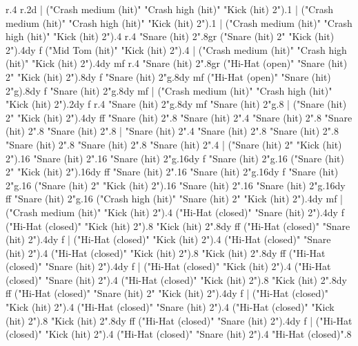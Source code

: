       r.4
      r.2{d}
    |
      ("Crash medium (hit)" "Crash high (hit)" "Kick (hit) 2").1
    |
      ("Crash medium (hit)" "Crash high (hit)" "Kick (hit) 2").1
    |
      ("Crash medium (hit)" "Crash high (hit)" "Kick (hit) 2").4
      r.4
      "Snare (hit) 2".8{gr}
      ("Snare (hit) 2" "Kick (hit) 2").4{dy f}
      ("Mid Tom (hit)" "Kick (hit) 2").4
    |
      ("Crash medium (hit)" "Crash high (hit)" "Kick (hit) 2").4{dy mf}
      r.4
      "Snare (hit) 2".8{gr}
      ("Hi-Hat (open)" "Snare (hit) 2" "Kick (hit) 2").8{dy f}
      "Snare (hit) 2"{g}.8{dy mf}
      ("Hi-Hat (open)" "Snare (hit) 2"{g}).8{dy f}
      "Snare (hit) 2"{g}.8{dy mf}
    |
      ("Crash medium (hit)" "Crash high (hit)" "Kick (hit) 2").2{dy f}
      r.4
      "Snare (hit) 2"{g}.8{dy mf}
      "Snare (hit) 2"{g}.8
    |
      ("Snare (hit) 2" "Kick (hit) 2").4{dy ff}
      "Snare (hit) 2".8
      "Snare (hit) 2".4
      "Snare (hit) 2".8
      "Snare (hit) 2".8
      "Snare (hit) 2".8
    |
      "Snare (hit) 2".4
      "Snare (hit) 2".8
      "Snare (hit) 2".8
      "Snare (hit) 2".8
      "Snare (hit) 2".8
      "Snare (hit) 2".4
    |
      ("Snare (hit) 2" "Kick (hit) 2").16
      "Snare (hit) 2".16
      "Snare (hit) 2"{g}.16{dy f}
      "Snare (hit) 2"{g}.16
      ("Snare (hit) 2" "Kick (hit) 2").16{dy ff}
      "Snare (hit) 2".16
      "Snare (hit) 2"{g}.16{dy f}
      "Snare (hit) 2"{g}.16
      ("Snare (hit) 2" "Kick (hit) 2").16
      "Snare (hit) 2".16
      "Snare (hit) 2"{g}.16{dy ff}
      "Snare (hit) 2"{g}.16
      ("Crash high (hit)" "Snare (hit) 2" "Kick (hit) 2").4{dy mf}
    |
      ("Crash medium (hit)" "Kick (hit) 2").4
      ("Hi-Hat (closed)" "Snare (hit) 2").4{dy f}
      ("Hi-Hat (closed)" "Kick (hit) 2").8
      "Kick (hit) 2".8{dy ff}
      ("Hi-Hat (closed)" "Snare (hit) 2").4{dy f}
    |
      ("Hi-Hat (closed)" "Kick (hit) 2").4
      ("Hi-Hat (closed)" "Snare (hit) 2").4
      ("Hi-Hat (closed)" "Kick (hit) 2").8
      "Kick (hit) 2".8{dy ff}
      ("Hi-Hat (closed)" "Snare (hit) 2").4{dy f}
    |
      ("Hi-Hat (closed)" "Kick (hit) 2").4
      ("Hi-Hat (closed)" "Snare (hit) 2").4
      ("Hi-Hat (closed)" "Kick (hit) 2").8
      "Kick (hit) 2".8{dy ff}
      ("Hi-Hat (closed)" "Snare (hit) 2" "Kick (hit) 2").4{dy f}
    |
      ("Hi-Hat (closed)" "Kick (hit) 2").4
      ("Hi-Hat (closed)" "Snare (hit) 2").4
      ("Hi-Hat (closed)" "Kick (hit) 2").8
      "Kick (hit) 2".8{dy ff}
      ("Hi-Hat (closed)" "Snare (hit) 2").4{dy f}
    |
      ("Hi-Hat (closed)" "Kick (hit) 2").4
      ("Hi-Hat (closed)" "Snare (hit) 2").4
      "Hi-Hat (closed)".8
